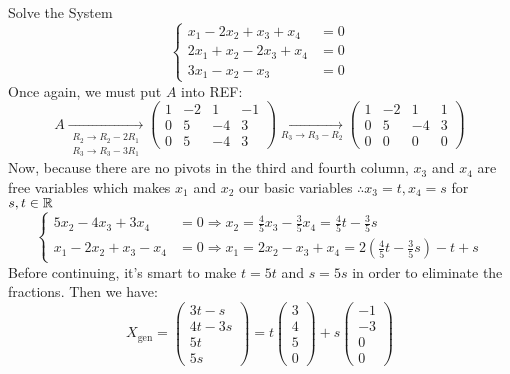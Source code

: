 \begin{example}{Solve the System}{}
    \[\begin{cases}
        x_1 - 2x_2 + x_3 + x_4 &= 0 \\
        2x_1 + x_2 - 2x_3 + x_4 &= 0 \\
        3x_1 - x_2 - x_3 &= 0 
    \end{cases}\]
    Once again, we must put $A$ into REF:
    \[A \xrightarrow[\substack{R_2 \to R_2 - 2R_1 \\ R_3 \to R_3 - 3R_1}]{} \begin{pmatrix}
        1 & -2 & 1 & -1 \\
        0 & 5 & -4 & 3 \\
        0 & 5 & -4 & 3
    \end{pmatrix}
    \xrightarrow[R_3 \to R_3 - R_2]{} 
    \begin{pmatrix}
        1 & -2 & 1 & 1 \\
        0 & 5 & -4 & 3 \\
        0 & 0 & 0 & 0 
    \end{pmatrix}
    \]
    Now, because there are no pivots in the third and fourth column, $x_3$ and $x_4$ are free variables which makes $x_1$ and $x_2$ our basic variables $\therefore x_3 = t, x_4 = s$ for $s, t \in \mathbb R$
    \[
        \begin{cases}
            5x_2 - 4x_3 + 3x_4 &= 0 \Rightarrow x_2 = \frac{4}{5}x_3 - \frac{3}{5}x_4 = \frac{4}{5}t - \frac{3}{5}s \\
            x_1 - 2x_2 + x_3 - x_4 &= 0 \Rightarrow x_1 = 2x_2 - x_3 + x_4 = 2(\frac{4}{5}t - \frac{3}{5}s) - t + s
        \end{cases} 
    \]
    Before continuing, it's smart to make $t = 5t$ and $s=5s$ in order to eliminate the fractions. Then we have:
    \[X_{\text{gen}} = \begin{pmatrix}
        3t - s \\ 4t - 3s \\ 5t \\ 5s
    \end{pmatrix} = t\begin{pmatrix}
        3 \\ 4 \\ 5 \\ 0 
    \end{pmatrix} + s\begin{pmatrix}
        -1 \\ -3 \\ 0 \\ 0 
    \end{pmatrix}\]
\end{example}

